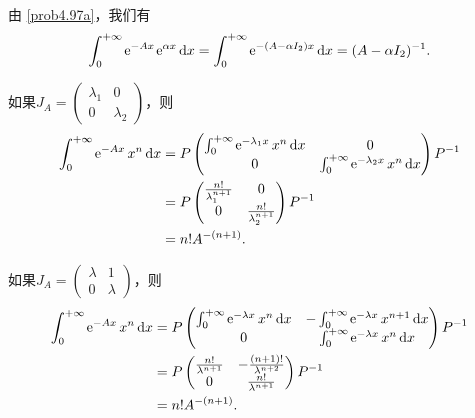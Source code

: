 \begin{solution}
\begin{inparaenum}[(a)]
    \item 由 \ref{prob4.97a}，我们有
    \[
      \int_0^{+\infty} \ee^{-Ax}\ee^{\alpha x} \dif x = \int_0^{+\infty}\ee^{-(A-\alpha I_2)x} \dif x = (A - \alpha I_2)^{-1}.
    \]

    \item 如果$J_A=\begin{pmatrix}
      \lambda_1 & 0 \\
      0 & \lambda_2
    \end{pmatrix}$，则
    \begin{align*}
      \int_0^{+\infty} \ee^{-Ax}x^n \dif x & = P
          \begin{pmatrix}
            \int_0^{+\infty}\ee^{-\lambda_1x}x^n \dif x & 0 \\
            0 & \int_0^{+\infty}\ee^{-\lambda_2x}x^n \dif x
          \end{pmatrix}P^{-1} \\
          & = P \begin{pmatrix}
            \frac{n!}{\lambda_1^{n+1}} & 0 \\
            0 & \frac{n!}{\lambda_2^{n+1}}
          \end{pmatrix} P^{-1} \\
          & = n!A^{-(n+1)}.
      \end{align*}

      如果$J_A=\begin{pmatrix}
        \lambda & 1 \\
        0 & \lambda
      \end{pmatrix}$，则
      \begin{align*}
      \int_0^{+\infty} \ee^{-Ax}x^n \dif x & = P
          \begin{pmatrix}
            \int_0^{+\infty}\ee^{-\lambda x}x^n \dif x & -\int_0^{+\infty}\ee^{-\lambda x}x^{n+1} \dif x \\
            0 & \int_0^{+\infty}\ee^{-\lambda x}x^n \dif x
          \end{pmatrix}P^{-1} \\
          & = P \begin{pmatrix}
            \frac{n!}{\lambda^{n+1}} & -\frac{(n+1)!}{\lambda^{n+2}} \\
            0 & \frac{n!}{\lambda^{n+1}}
          \end{pmatrix} P^{-1} \\
          & = n!A^{-(n+1)}.
      \end{align*}
  \end{inparaenum}
\end{solution}


